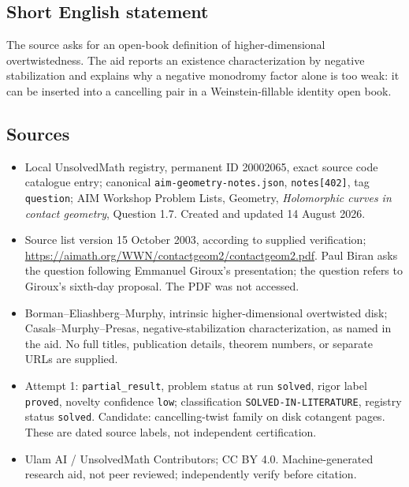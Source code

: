 \documentclass[11pt]{article}
\begin{document}
\subsection{Short English statement}
The source asks for an open-book definition of higher-dimensional overtwistedness. The aid reports an existence characterization by negative stabilization and explains why a negative monodromy factor alone is too weak: it can be inserted into a cancelling pair in a Weinstein-fillable identity open book.
\subsection{Sources}
\begin{itemize}
\item Local UnsolvedMath registry, permanent ID 20002065, exact source code catalogue entry; canonical \texttt{aim-geometry-notes.json}, \texttt{notes[402]}, tag \texttt{question}; AIM Workshop Problem Lists, Geometry, \emph{Holomorphic curves in contact geometry}, Question 1.7. Created and updated 14 August 2026.
\item Source list version 15 October 2003, according to supplied verification; \url{https://aimath.org/WWN/contactgeom2/contactgeom2.pdf}. Paul Biran asks the question following Emmanuel Giroux's presentation; the question refers to Giroux's sixth-day proposal. The PDF was not accessed.
\item Borman--Eliashberg--Murphy, intrinsic higher-dimensional overtwisted disk; Casals--Murphy--Presas, negative-stabilization characterization, as named in the aid. No full titles, publication details, theorem numbers, or separate URLs are supplied.
\item Attempt 1: \texttt{partial\_result}, problem status at run \texttt{solved}, rigor label \texttt{proved}, novelty confidence \texttt{low}; classification \texttt{SOLVED-IN-LITERATURE}, registry status \texttt{solved}. Candidate: cancelling-twist family on disk cotangent pages. These are dated source labels, not independent certification.
\item Ulam AI / UnsolvedMath Contributors; CC BY 4.0. Machine-generated research aid, not peer reviewed; independently verify before citation.
\end{itemize}
\end{document}
